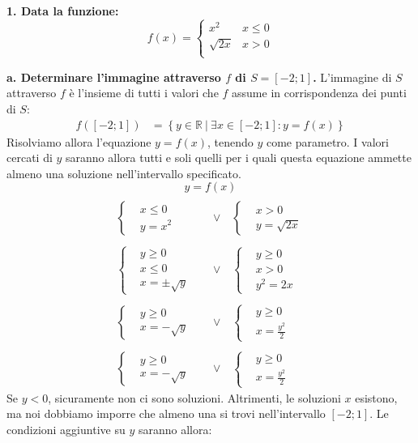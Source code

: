 \documentclass{article}
\newcommand*{\sys}[1]{\left\{\begin{aligned}#1\end{aligned}\right.}
\begin{document}
\textbf{1. Data la funzione:}
\[
    f(x) = \begin{cases}
        x^2       & x \le 0 \\
        \sqrt{2x} & x > 0   \\
    \end{cases}
\]

\textbf{a. Determinare l'immagine attraverso $f$ di $S=[-2;1]$.}
L'immagine di $S$ attraverso $f$ è l'insieme di tutti i valori che $f$
assume in corrispondenza dei punti di $S$:
\[\begin{aligned}
    f(\left[-2;1\right])
    &= \left\{y\in\mathbb{R}\:|\:\exists x\in\left[-2;1\right]:y=f(x)\right\}
\end{aligned}\]
Risolviamo allora l'equazione $y = f(x)$, tenendo $y$ come parametro.
I valori cercati di $y$ saranno allora tutti e soli quelli per i quali questa
equazione ammette almeno una soluzione nell'intervallo specificato.
\[y = f(x)\]
\[\begin{aligned}
    \:\\
        \sys{&x\le0\\&y = x^2}
        \quad&\vee\quad
        \sys{&x > 0 \\ &y = \sqrt{2x}}
    \\\:\\
        \sys{&y\ge0\\&x\le 0\\&x=\pm\sqrt{y}}
        \quad&\vee\quad
        \sys{&y\ge0\\&x>0\\&y^2=2x}
    \\\:\\
        \sys{&y\ge0\\&x=-\sqrt{y}}
        \quad&\vee\quad
        \sys{&y\ge0\\&x=\frac{y^2}{2}}
    \\\:\\
        \sys{&y\ge0\\&x=-\sqrt{y}}
        \quad&\vee\quad
        \sys{&y\ge0\\&x=\frac{y^2}{2}}
\end{aligned}\]
Se $y<0$, sicuramente non ci sono soluzioni.
Altrimenti, le soluzioni $x$ esistono, ma noi dobbiamo imporre che almeno una si
trovi nell'intervallo $\left[-2;1\right]$. Le condizioni aggiuntive su $y$
saranno allora:
\end{document}
